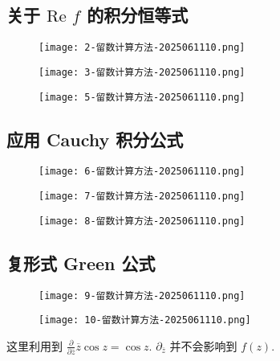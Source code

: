 \subsection{关于 \texorpdfstring{$\text{Re }f$}{textRe f} 的积分恒等式}

\begin{figure}[H]
\centering
\texttt{[image: 2-留数计算方法-2025061110.png]}
\label{}
\end{figure}
\begin{figure}[H]
\centering
\texttt{[image: 3-留数计算方法-2025061110.png]}
\label{}
\end{figure}
\begin{figure}[H]
\centering
\texttt{[image: 5-留数计算方法-2025061110.png]}
\label{}
\end{figure}

\subsection{应用 Cauchy 积分公式}

\begin{figure}[H]
\centering
\texttt{[image: 6-留数计算方法-2025061110.png]}
\label{}
\end{figure}
\begin{figure}[H]
\centering
\texttt{[image: 7-留数计算方法-2025061110.png]}
\label{}
\end{figure}
\begin{figure}[H]
\centering
\texttt{[image: 8-留数计算方法-2025061110.png]}
\label{}
\end{figure}

\subsection{复形式 Green 公式}

\begin{figure}[H]
\centering
\texttt{[image: 9-留数计算方法-2025061110.png]}
\label{}
\end{figure}
\begin{figure}[H]
\centering
\texttt{[image: 10-留数计算方法-2025061110.png]}
\label{}
\end{figure}

\begin{note}
这里利用到 $\frac{ \partial   }{ \partial \overline{z} }\overline{z}\cos z=\cos z$. $\partial_{\overline{z}}$ 并不会影响到 $f(z)$.
\end{note}
